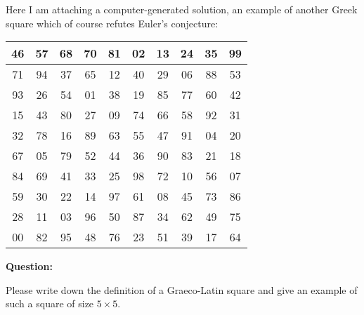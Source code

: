 \documentclass[12pt]{article} %
\begin{document}
  Here I am attaching a computer-generated solution, an example of another Greek square
which of course refutes Euler's conjecture:


\begin{tabular}{| c | c | c | c | c | c | c | c | c | c | }
\hline
 46  & 57 & 68 & 70 & 81 & 02 & 13 & 24 & 35 & 99  \\
\hline
 71  & 94 & 37 & 65 & 12 & 40 & 29 & 06 & 88 & 53  \\
\hline
 93  & 26 & 54 & 01 & 38 & 19 & 85 & 77 & 60 & 42  \\
\hline
 15 & 43 & 80 & 27 & 09 & 74 & 66 & 58 & 92 & 31  \\
\hline
 32 & 78 & 16 & 89 & 63 & 55 & 47 & 91 & 04 & 20  \\
\hline
 67  & 05 & 79 & 52 & 44 & 36 & 90 & 83 & 21 & 18  \\
\hline
 84  & 69 & 41 & 33 & 25 & 98 & 72 & 10 & 56 & 07  \\
\hline
  59 & 30 & 22 & 14 & 97 & 61 & 08 & 45 & 73 & 86  \\
\hline
  28 & 11 & 03 & 96 & 50 & 87 & 34 & 62 & 49 & 75  \\
\hline
  00 & 82 & 95 & 48 & 76 & 23 & 51 & 39 & 17 & 64  \\
\hline
\end{tabular}

{\bf Question:}

Please write down the definition of a Graeco-Latin square
and give an example of such a square of size $5 \times 5$.
\end{document}
